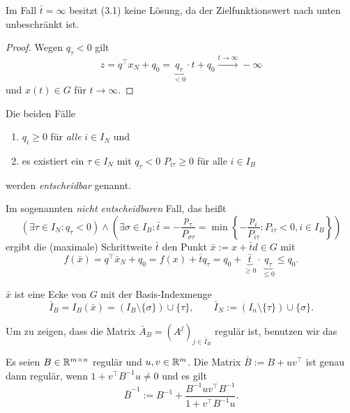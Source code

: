 \begin{aus}
  Im Fall $\bar{t} = \infty$ besitzt (3.1) keine Lösung, da der
  Zielfunktionswert nach unten unbeschränkt ist.
\end{aus}

\begin{proof}
  Wegen $q_\tau < 0$ gilt
  \[ z = q^\top x_N + q_0 = \underbrace{q_\tau}_{<0} \cdot t + q_0 \xrightarrow{t
      \to \infty} -\infty \]
  und $x(t) \in G$ für $t \to \infty$.
\end{proof}

\begin{rmrk}
  Die beiden Fälle
  \begin{enumerate}[(1)]
  \item $q_i \ge 0$ für \emph{alle} $i \in I_N$ und
  \item es existiert ein $\tau \in I_N$ mit $q_\tau < 0$ $P_{i\tau} \ge 0$ für
    alle $i \in I_B$
  \end{enumerate}
  werden \emph{entscheidbar} genannt.

  Im sogenannten \emph{nicht entscheidbaren} Fall, das heißt
  \[ (\exists \tau \in I_N : q_\tau < 0)
    \wedge
    \left( \exists \sigma \in I_B : \bar{t} = - \frac{p_\tau}{P_{\sigma\tau}} =
      \min \left\{ -\frac{p_i}{P_{i\tau}} : P_{i\tau} < 0, i \in I_B \right\}
    \right) \]
  ergibt die (maximale) Schrittweite $\bar{t}$ den Punkt
  $\bar{x} := x + \bar{t} d \in G$ mit
  \[ f(\bar{x}) = q^\top \bar{x}_N + q_0 = f(x) + \bar{t} q_\tau = q_0 +
    \underbrace{\bar{t}}_{\ge 0} \cdot
    \underbrace{q_\tau}_{\le 0}
    \le q_0. \]
\end{rmrk}

\begin{thm}
  $\bar{x}$ ist eine Ecke von $G$ mit der Basis-Indexmenge
  \begin{equation}
    \bar{I}_B = I_B(\bar{x}) = (I_B \setminus \{ \sigma \} ) \cup \{ \tau
    \}, \qquad \bar{I}_N := (I_n \setminus \{ \tau \}) \cup \{ \sigma \}.
  \end{equation}
\end{thm}

Um zu zeigen, dass die Matrix $\bar{A}_B = (A^j)_{j \in \bar{I}_B}$ regulär ist,
benutzen wir das
\begin{lem}
  Es seien $B \in \mathbb{R}^{m \times n}$ regulär und $u,v \in \mathbb{R}^m$. Die Matrix
  $\bar{B} := B + uv^\top$ ist genau dann regulär, wenn $1 + v^\top B^{-1} u \ne 0$
  und es gilt
  \begin{equation}
    \bar{B}^{-1} := B^{-1} + \frac{B^{-1} u v^\top B^{-1}}{1 + v^\top B^{-1} u}.
  \end{equation}
\end{lem}

